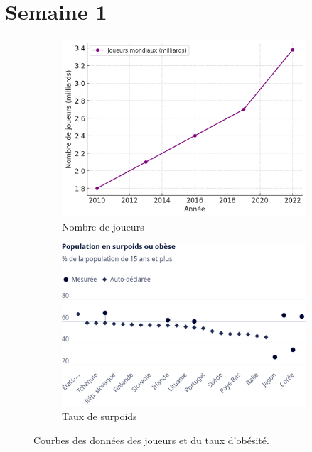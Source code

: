 \section{Semaine 1}\label{sec:semaine1}

\begin{figure}[htbp]
    \centering
    \begin{subfigure}[b]{0.45\textwidth}
        \centering
        \includegraphics[width=\textwidth]{images/nombre_joueurs}
        \caption{Nombre de joueurs~\cite{newzoo_gaming_market_2023}}
        \label{fig:nombre-joueurs}
    \end{subfigure}
    \hfill
    \begin{subfigure}[b]{0.45\textwidth}
        \centering
        \includegraphics[width=\textwidth]{images/taux_obesite}
        \caption{Taux de \hyperref[itm:surpoids]{surpoids}~\cite{oecd_obesity_2019}}
        \label{fig:taux-obesite}
    \end{subfigure}
    \caption{Courbes des données des joueurs et du taux d'obésité.}
    \label{fig:courbes-donnees}
\end{figure}